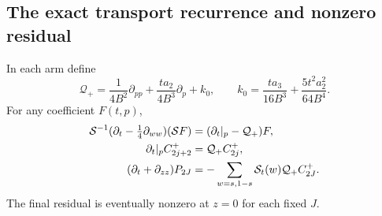 \subsection{The exact transport recurrence and nonzero residual}
\begin{proposition}
\label{prop:positive-residual}
In each arm define
\begin{equation}
 \mathcal Q_+=\frac1{4B^2}\partial_{pp}
  +\frac{ta_2}{4B^3}\partial_p+k_0,\qquad
 k_0=\frac{ta_3}{16B^3}+\frac{5t^2a_2^2}{64B^4}.
 \label{eq:positive-Q}
\end{equation}
For any coefficient $F(t,p)$,
\begin{align}
 \mathcal S^{-1}(\partial_t-\tfrac14\partial_{ww})(\mathcal S F)
      &=(\partial_t|_p-\mathcal Q_+)F,\notag\\
 \partial_t|_p C_{2j+2}^+&=\mathcal Q_+C_{2j}^+,\notag\\
 (\partial_t+\partial_{zz})P_{2J}
      &=-\sum_{w=s,1-s}\mathcal S_t(w)\mathcal Q_+C_{2J}^+.
 \label{eq:positive-exact-residual}
\end{align}
The final residual is eventually nonzero at $z=0$ for each fixed $J$.
\end{proposition}
